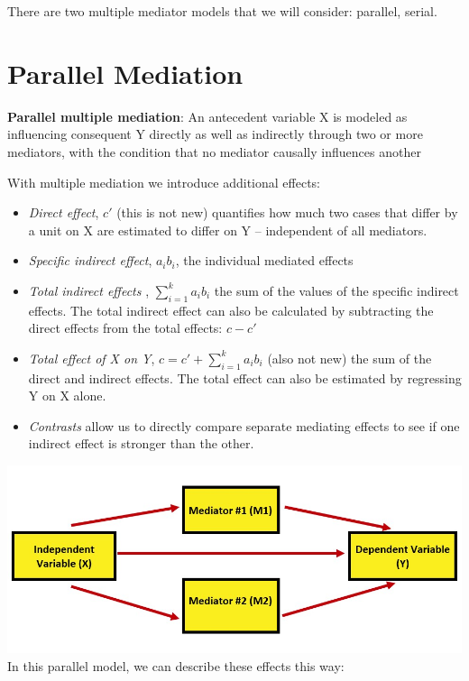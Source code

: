 \documentclass[
  11pt,
]{book}
\providecommand{\tightlist}{%
  \setlength{\itemsep}{0pt}\setlength{\parskip}{0pt}}
\begin{document}
There are two multiple mediator models that we will consider: parallel, serial.

\hypertarget{parallel-mediation}{%
\section{Parallel Mediation}\label{parallel-mediation}}

\textbf{Parallel multiple mediation}: An antecedent variable X is modeled as influencing consequent Y directly as well as indirectly through two or more mediators, with the condition that no mediator causally influences another \citep[p.~149]{hayes_introduction_2018}

With multiple mediation we introduce additional effects:

\begin{itemize}
\tightlist
\item
  \emph{Direct effect}, \(c'\) (this is not new) quantifies how much two cases that differ by a unit on X are estimated to differ on Y -- independent of all mediators.
\item
  \emph{Specific indirect effect}, \(a_{i}b_{i}\), the individual mediated effects
\item
  \emph{Total indirect effects }, \(\sum_{i=1}^{k}a_{i}b_{i}\) the sum of the values of the specific indirect effects. The total indirect effect can also be calculated by subtracting the direct effects from the total effects: \(c - c'\)
\item
  \emph{Total effect of X on Y}, \(c = c' + \sum_{i=1}^{k}a_{i}b_{i}\) (also not new) the sum of the direct and indirect effects. The total effect can also be estimated by regressing Y on X alone.
\item
  \emph{Contrasts} allow us to directly compare separate mediating effects to see if one indirect effect is stronger than the other.
\end{itemize}

\includegraphics{images/CompMed/ParaMed.jpg} In this parallel model, we can describe these effects this way:
\end{document}
